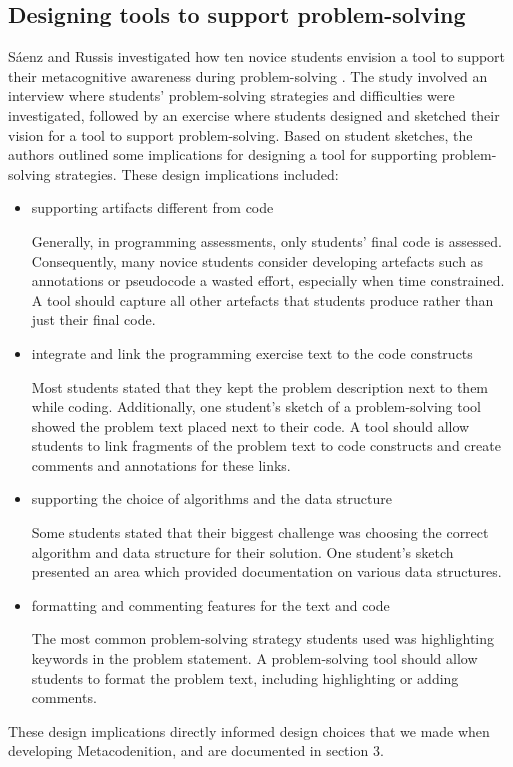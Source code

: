\documentclass[sigconf,authorversion,nonacm]{acmart}
\begin{document}
\subsection{Designing tools to support problem-solving}
Sáenz and Russis investigated how ten novice students envision a tool to support their metacognitive awareness during problem-solving \cite{saenz2022}. The study involved an interview where students' problem-solving strategies and difficulties were investigated, followed by an exercise where students designed and sketched their vision for a tool to support problem-solving. Based on student sketches, the authors outlined some implications for designing a tool for supporting problem-solving strategies. These design implications included:
\begin{itemize}
    \item supporting artifacts different from code
    \begin{description}
        Generally, in programming assessments, only students' final code is assessed. Consequently, many novice students consider developing artefacts such as annotations or pseudocode a wasted effort, especially when time constrained. A tool should capture all other artefacts that students produce rather than just their final code.
    \end{description}
    \item integrate and link the programming exercise text to the code constructs
    \begin{description}
        Most students stated that they kept the problem description next to them while coding. Additionally, one student's sketch of a problem-solving tool showed the problem text placed next to their code. A tool should allow students to link fragments of the problem text to code constructs and create comments and annotations for these links.
    \end{description}
    \item supporting the choice of algorithms and the data structure
    \begin{description}
        Some students stated that their biggest challenge was choosing the correct algorithm and data structure for their solution. One student's sketch presented an area which provided documentation on various data structures.
    \end{description}
    \item formatting and commenting features for the text and code
    \begin{description}
       The most common problem-solving strategy students used was highlighting keywords in the problem statement. A problem-solving tool should allow students to format the problem text, including highlighting or adding comments.
    \end{description}
\end{itemize}
These design implications directly informed design choices that we made when developing Metacodenition, and are documented in section 3.
\end{document}
